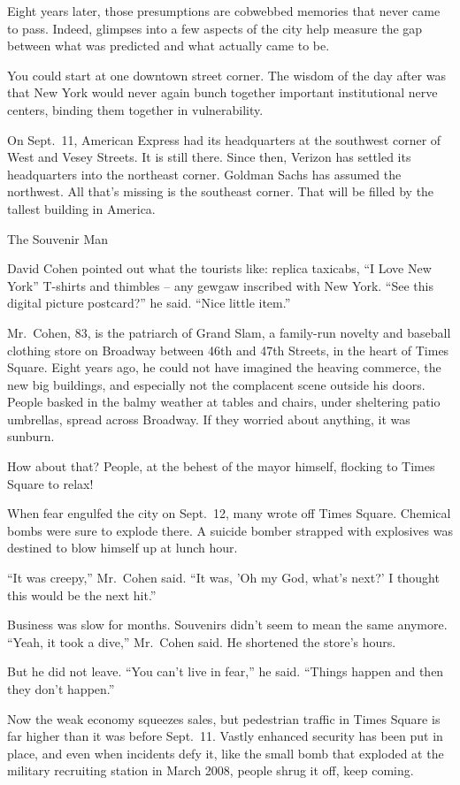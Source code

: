 ﻿\documentclass[12pt]{article}
\begin{document}
Eight years later, those presumptions are cobwebbed memories that never came to pass. Indeed,
glimpses into a few aspects of the city help measure the gap between what was predicted and what
actually came to be.

You could start at one downtown street corner. The wisdom of the day after was that New York would
never again bunch together important institutional nerve centers, binding them together in
vulnerability.

On Sept.~11, American Express had its headquarters at the southwest corner of West and Vesey
Streets. It is still there. Since then, Verizon has settled its headquarters into the northeast
corner. Goldman Sachs has assumed the northwest. All that's missing is the southeast corner. That
will be filled by the tallest building in America.

The Souvenir Man

David Cohen pointed out what the tourists like: replica taxicabs, ``I Love New York'' T-shirts and
thimbles -- any gewgaw inscribed with New York. ``See this digital picture postcard?'' he said.
``Nice little item.''

Mr.~Cohen, 83, is the patriarch of Grand Slam, a family-run novelty and baseball clothing store on
Broadway between 46th and 47th Streets, in the heart of Times Square. Eight years ago, he could not
have imagined the heaving commerce, the new big buildings, and especially not the complacent scene
outside his doors. People basked in the balmy weather at tables and chairs, under sheltering patio
umbrellas, spread across Broadway. If they worried about anything, it was sunburn.

How about that? People, at the behest of the mayor himself, flocking to Times Square to relax!

When fear engulfed the city on Sept.~12, many wrote off Times Square. Chemical bombs were sure to
explode there. A suicide bomber strapped with explosives was destined to blow himself up at lunch
hour.

``It was creepy,'' Mr.~Cohen said. ``It was, 'Oh my God, what's next?' I thought this would be the
next hit.''

Business was slow for months. Souvenirs didn't seem to mean the same anymore. ``Yeah, it took a
dive,'' Mr.~Cohen said. He shortened the store's hours.

But he did not leave. ``You can't live in fear,'' he said. ``Things happen and then they don't
happen.''

Now the weak economy squeezes sales, but pedestrian traffic in Times Square is far higher than it
was before Sept.~11. Vastly enhanced security has been put in place, and even when incidents defy
it, like the small bomb that exploded at the military recruiting station in March 2008, people shrug
it off, keep coming.
\end{document}
